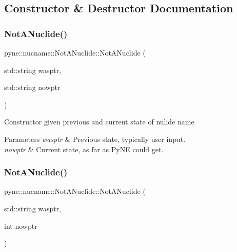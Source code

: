 \subsection{Constructor \& Destructor Documentation}
\mbox{\label{classpyne_1_1nucname_1_1_not_a_nuclide_a32741575cb99d294d54f39bc4ca5e51c}} 
\subsubsection{\texorpdfstring{Not\+A\+Nuclide()}{NotANuclide()}\hspace{0.1cm}{\footnotesize\ttfamily [1/4]}}
{\footnotesize\ttfamily pyne\+::nucname\+::\+Not\+A\+Nuclide\+::\+Not\+A\+Nuclide (\begin{DoxyParamCaption}\item[{std\+::string}]{wasptr,  }\item[{std\+::string}]{nowptr }\end{DoxyParamCaption})\hspace{0.3cm}{\ttfamily [inline]}}

Constructor given previous and current state of nulide name 
\begin{DoxyParams}{Parameters}
{\em wasptr} & Previous state, typically user input. \\
\hline
{\em nowptr} & Current state, as far as Py\+NE could get. \\
\hline
\end{DoxyParams}
\mbox{\label{classpyne_1_1nucname_1_1_not_a_nuclide_a10f9f9c4be5b439f1dafd1450943252d}} 
\subsubsection{\texorpdfstring{Not\+A\+Nuclide()}{NotANuclide()}\hspace{0.1cm}{\footnotesize\ttfamily [2/4]}}
{\footnotesize\ttfamily pyne\+::nucname\+::\+Not\+A\+Nuclide\+::\+Not\+A\+Nuclide (\begin{DoxyParamCaption}\item[{std\+::string}]{wasptr,  }\item[{int}]{nowptr }\end{DoxyParamCaption})\hspace{0.3cm}{\ttfamily [inline]}}

